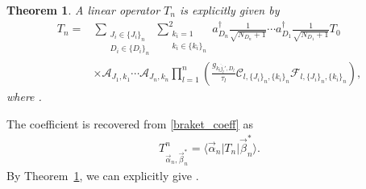 \documentclass[10pt,a4paper]{amsart}
\numberwithin{equation}{section}
\newtheorem{Theorem}{Theorem}[section]
\begin{document}
\begin{Theorem}\label{thm_G24_opr}
A linear operator $T_{n}$ is explicitly given by
\begin{align}
T_{n}
={}&
\sum_{
 \substack{
 J_{i}
 \in
 \{
 J_{i}
 \}_{n}
 \\
 D_{i}
 \in
 \{
 D_{i}
 \}_{n}
 }
}
\sum_{
 \substack{
 k_{i}=1
 \\
 k_{i}
 \in
 \{
 k_{i}
 \}_{n}
 }
}^{2}
a_{D_{n}}^{\dagger}
\frac{1}{
 \sqrt{
 N_{D_{n}}
 +
 1
 }
}
\cdots
a_{D_{1}}^{\dagger}
\frac{1}{
 \sqrt{
 N_{D_{1}}
 +
 1
 }
}
T_{0}
\nonumber
\\
&
\times
\mathcal{A}_{
J_{1},
k_{1}
}
\cdots
\mathcal{A}_{
J_{n},
k_{n}
}
\prod_{l=1}^{n}
 \left(
\frac{
 g_{\overline{k_{l}{j_{l}}'},D_{l}}
}{
 \tau_{l}
}
\mathcal{C}_{
l,
\{
 J_{i}
\}_{n},
\{
 k_{i}
\}_{n}
}
\mathcal{F}_{
l,
\{
 J_{i}
\}_{n},
\{
 k_{i}
\}_{n}
}
 \right),
\label{star_coeff_G2_4_Opr}
\end{align}
where
.
\end{Theorem}

The coefficient
 is recovered from \eqref{braket_coeff} as
\begin{align}
 T^{n}_{\vec{\alpha}_{n},\vec{\beta}_{n}^{\ast}}
 =
 \langle
 \vec{\alpha}_{n}
 |
 T_{n}
 |
 \vec{\beta}_{n}^{\ast}
 \rangle
 .
 \label{opr_T_norm}
\end{align}
By Theorem~\ref{thm_G24_opr}, we can explicitly give .
\end{document}
